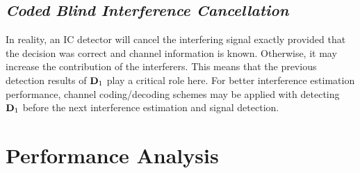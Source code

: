 \documentclass[conference]{IEEEtran}
\newcommand{\bD}{{\bf D}}
\begin{document}
\subsection{\em Coded Blind Interference Cancellation}
In reality, an IC detector will cancel the interfering signal
exactly provided that the decision was correct and channel
information is known. Otherwise, it may increase the contribution
of the interferers. This means that the previous detection results
of $\bD_{1}$ play a critical role here. For better interference
estimation performance, channel coding/decoding schemes may be
applied with detecting $\bD_{1}$ before the next interference
estimation and signal detection.
\section{Performance Analysis}
\end{document}

